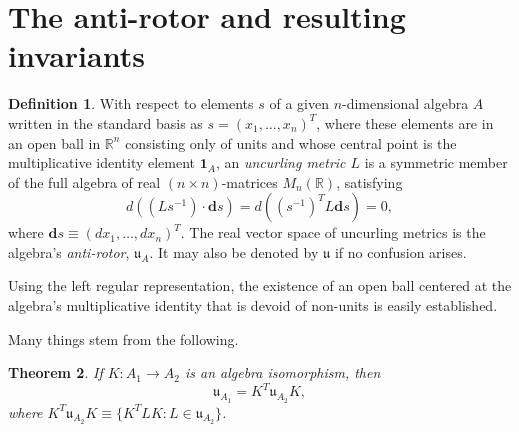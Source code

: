 \documentclass{amsart}
\newtheorem{theorem}{Theorem}
\theoremstyle{definition}
\newtheorem{definition}[theorem]{Definition}
\numberwithin{theorem}{section}
\numberwithin{equation}{section}
\begin{document}
\enlargethispage{2cm}
\section{The anti-rotor and resulting invariants}  
     \begin{definition}\label{7/21/23.1} With respect to elements $s$ of a given $n$-dimensional algebra $A$ written in the standard basis as $s= (x_1,\dots,x_n)^T$, where these elements are in an open ball in $\mathbb{R}^n$ consisting only of units and whose central point is the multiplicative identity element $\mathbf{1}_A$, an {\it uncurling metric $L$} is a symmetric member of the full algebra of real $(n\times n)$-matrices $M_n(\mathbb{R})$,  satisfying \begin{equation}\label{5/22/25.3} d\left((Ls^{-1})\cdot \mathbf{d}s\right) = d\left((s^{-1})^T L \mathbf{d}s\right) = 0, \end{equation} where $\mathbf{d}s \equiv (dx_1,\dots,dx_n)^T$.  The real vector space of uncurling metrics is the algebra's {\it anti-rotor}, $\mathfrak{u}_A$.  It may also be denoted by $\mathfrak{u}$ if no confusion arises.    \end{definition}
     
Using the left regular representation, the existence of an open ball centered at the algebra's multiplicative identity that is devoid of non-units is easily established. 

Many things stem from the following.

  \begin{theorem} \label{6/6/23.1} If $K:A_1\rightarrow A_2$ is an algebra isomorphism, then \begin{equation}\label{5/23/23.1} \mathfrak{u}_{A_1} = K^T \mathfrak{u}_{A_2} K, \end{equation} 
   where $K^T \mathfrak{u}_{A_2} K \equiv \{K^T L K:L\in \mathfrak{u}_{A_2}\}$.
   \end{theorem}
\end{document}
